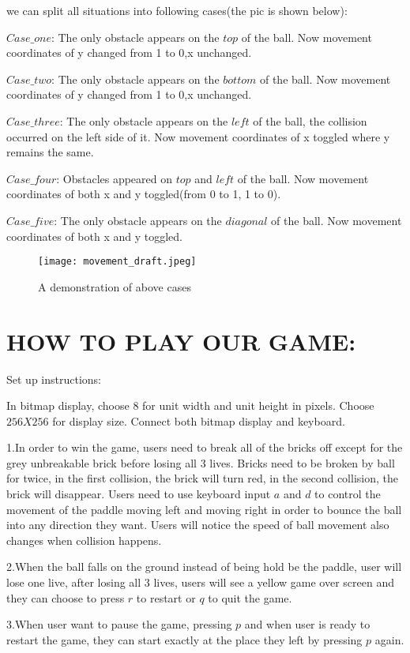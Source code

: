 \documentclass{article}
\begin{document}
we can split all situations into following cases(the pic is shown below):

$Case\_one$:
The only obstacle appears on the $top$ of the ball. Now movement coordinates of y changed from 1 to 0,x unchanged.


$Case\_two$:
The only obstacle appears on the $bottom$ of the ball. Now movement coordinates of y changed from 1 to 0,x unchanged.


$Case\_three$:
The only obstacle appears on the $left$ of the ball, the collision occurred on the left side of it. Now movement coordinates of x toggled where y remains the same.


$Case\_four$:
Obstacles appeared on $top$ and $left$ of the ball. Now movement coordinates of both x and y toggled(from 0 to 1, 1 to 0).



$Case\_five$:
The only obstacle appears on the $diagonal$ of the ball. Now movement coordinates of both x and y toggled.
\begin{figure}[ht!]
    \centering
    \texttt{[image: movement\_draft.jpeg]}
    \caption{A demonstration of above cases}
    \label{f:part1}
\end{figure}

\section{HOW TO PLAY OUR GAME:}
Set up instructions:

In bitmap display, choose 8 for unit width and unit height in pixels. Choose $256 X 256$ for display size. Connect both bitmap display and keyboard.

1.In order to win the game, users need to break all of the bricks off except for the grey unbreakable brick before losing all 3 lives. Bricks need to be broken by ball for twice, in the first collision, the brick will turn red, in the second collision, the brick will disappear. Users need to use keyboard input $a$ and $d$ to control the movement of the paddle moving left and moving right in order to bounce the ball into any direction they want. Users will notice the speed of ball movement also changes when collision happens.

2.When the ball falls on the ground instead of being hold be the paddle, user will lose one live, after losing all 3 lives, users will see a yellow game over screen and they can choose to press $r$ to restart or $q$ to quit the game.

3.When user want to pause the game, pressing $p$ and when user is ready to restart the game, they can start exactly at the place they left by pressing $p$ again.
\end{document}
